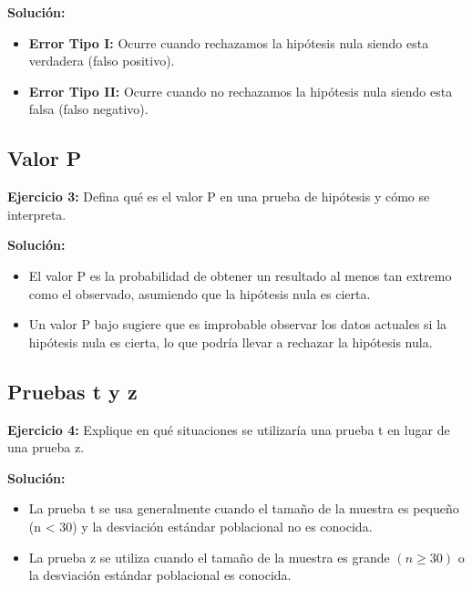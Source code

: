 \documentclass{article}
\begin{document}
\textbf{Solución:}
\begin{itemize}
    \item \textbf{Error Tipo I:} Ocurre cuando rechazamos la hipótesis nula siendo esta verdadera (falso positivo).
    \item \textbf{Error Tipo II:} Ocurre cuando no rechazamos la hipótesis nula siendo esta falsa (falso negativo).
\end{itemize}

\subsection{Valor P}

\textbf{Ejercicio 3:} Defina qué es el valor P en una prueba de hipótesis y cómo se interpreta.

\textbf{Solución:}
\begin{itemize}
    \item El valor P es la probabilidad de obtener un resultado al menos tan extremo como el observado, asumiendo que la hipótesis nula es cierta.
    \item Un valor P bajo sugiere que es improbable observar los datos actuales si la hipótesis nula es cierta, lo que podría llevar a rechazar la hipótesis nula.
\end{itemize}

\subsection{Pruebas t y z}

\textbf{Ejercicio 4:} Explique en qué situaciones se utilizaría una prueba t en lugar de una prueba z.

\textbf{Solución:}
\begin{itemize}
    \item La prueba t se usa generalmente cuando el tamaño de la muestra es pequeño (n < 30) y la desviación estándar poblacional no es conocida.
    \item La prueba z se utiliza cuando el tamaño de la muestra es grande $(n \geq 30)$ o la desviación estándar poblacional es conocida.
\end{itemize}
\end{document}
